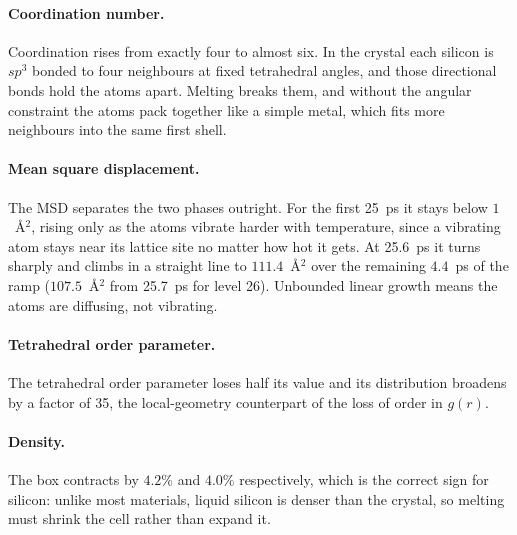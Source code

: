\documentclass{article}
\begin{document}
\paragraph{Coordination number.}
Coordination rises from exactly four to almost six. In the crystal each silicon is $sp^3$ bonded to four neighbours at fixed tetrahedral angles, and those directional bonds hold the atoms apart. Melting breaks them, and without the angular constraint the atoms pack together like a simple metal, which fits more neighbours into the same first shell.

\paragraph{Mean square displacement.}
The MSD separates the two phases outright. For the first 25~ps it stays below $1$~\AA$^2$, rising only as the atoms vibrate harder with temperature, since a vibrating atom stays near its lattice site no matter how hot it gets. At 25.6~ps it turns sharply and climbs in a straight line to $111.4$~\AA$^2$ over the remaining $4.4$~ps of the ramp ($107.5$~\AA$^2$ from 25.7~ps for level 26). Unbounded linear growth means the atoms are diffusing, not vibrating.

\paragraph{Tetrahedral order parameter.}
The tetrahedral order parameter loses half its value and its distribution broadens by a factor of 35, the local-geometry counterpart of the loss of order in $g(r)$.

\paragraph{Density.}
The box contracts by $4.2\%$ and $4.0\%$ respectively, which is the correct sign for silicon: unlike most materials, liquid silicon is denser than the crystal, so melting must shrink the cell rather than expand it.
\end{document}
